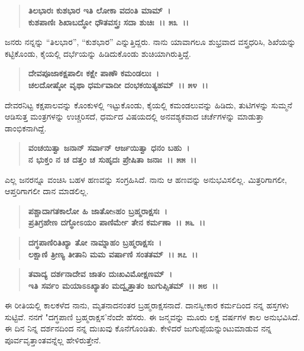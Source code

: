 \begin{verse}
\textbf{ತಿಲಭಾರಃ ಕುಶಭಾರ ಇತಿ ಲೋಕಾ ವದಂತಿ ಮಾಮ್~।}\\\textbf{ಕುಶಪಾಣಿಃ ಶಿಖಾಬದ್ಧೋ ಧೌತವಸ್ತ್ರಃ ಸದಾ ಶುಚಿಃ~।। ೫೩~।।}
\end{verse}

ಜನರು ನನ್ನನ್ನು “ತಿಲಭಾರ”, “ಕುಶಭಾರ” ಎನ್ನುತ್ತಿದ್ದರು. ನಾನು ಯಾವಾಗಲೂ ಶುಭ್ರವಾದ ವಸ್ತ್ರಧರಿಸಿ, ಶಿಖೆಯನ್ನು ಕಟ್ಟಿಕೊಂಡು, ಕೈಯಲ್ಲಿ ದರ್ಭೆಯನ್ನು ಹಿಡಿದುಕೊಂಡು ಶುಚಿಯಾಗಿರುತ್ತಿದ್ದೆ.

\begin{verse}
\textbf{ದೇವಪೂಜಾಕಕ್ಷಪಾಲಿಃ ಕಕ್ಷೇ ಪಾಣೌ ಕಮಂಡಲುಃ~।}\\\textbf{ಚಲದೋಷ್ಠೋ ವೃಥಾ ಧರ್ಮವಾದೀ ದಂಭಕಯಿತ್ಯಹಮ್~।। ೫೪~।।}
\end{verse}

ದೇವರನಿಟ್ಟ ಕಕ್ಷಪಾಲವನ್ನು ಕೊಂಕುಳಲ್ಲಿ ಇಟ್ಟುಕೊಂಡು, ಕೈಯಲ್ಲಿ ಕಮಂಡಲುವನ್ನು ಹಿಡಿದು, ತುಟಿಗಳನ್ನು ಸುಮ್ಮನೆ ಆಡಿಸುತ್ತ ಮಂತ್ರಗಳನ್ನು ಉಚ್ಚರಿಸದೆ, ಧರ್ಮದ ವಿಷಯದಲ್ಲಿ ಅನವಶ್ಯಕವಾದ ಚರ್ಚೆಗಳನ್ನು ಮಾಡುತ್ತಾ ಡಾಂಭಿಕನಾಗಿದ್ದೆ.

\begin{verse}
\textbf{ವಂಚಯಿತ್ವಾ ಜನಾನ್ ಸರ್ವಾನ್ ಆರ್ಜಯಿತ್ವಾ ಧನಂ ಬಹು~।}\\\textbf{ನ ಭುಕ್ತಂ ನ ಚ ದತ್ತಂ ಚ ಸುಹೃದಃ ಪ್ರೇಷಿತಾ ಜನಾಃ~।। ೫೫~।।}
\end{verse}

ಎಲ್ಲ ಜನರನ್ನೂ ವಂಚಿಸಿ ಬಹಳ ಹಣವನ್ನು ಸಂಗ್ರಹಿಸಿದೆ. ನಾನು ಆ ಹಣವನ್ನು ಅನುಭವಿಸಲಿಲ್ಲ. ಮಿತ್ರರಿಗಾಗಲೀ, ಆಪ್ತರಿಗಾಗಲೀ ದಾನ ಮಾಡಲಿಲ್ಲ.

\begin{verse}
\textbf{ಪಶ್ಚಾದಾಗತಕಾಲೋ ಹಿ ಜಾತೋsಹಂ ಬ್ರಹ್ಮರಾಕ್ಷಸಃ~।}\\\textbf{ಪ್ರತಿಗ್ರಹೇಣ ದಗ್ಧೋಽಯಂ ಪಾಣಿರ್ಮೇ ತೇನ ಕರ್ಮಣಾ~।। ೫೬~।।} 
\end{verse}

\begin{verse}
\textbf{ದಗ್ಧಪಾಣಿರಿತಿಖ್ಯಾ ತೋ ನಾಮ್ನಾಹಂ ಬ್ರಹ್ಮರಾಕ್ಷಸಃ~।}\\\textbf{ಲಕ್ಷಾಣಿ ತ್ರೀಣ್ಯ ತೀತಾನಿ ಮಮ ವರ್ಷಾಣಿ ಸಂತತಮ್~।। ೫೭~।। }
\end{verse}

\begin{verse}
\textbf{ತವಾದ್ಯ ದರ್ಶನಾದೇವ ಜಾತಂ ದುಃಖವಿಮೋಕ್ಷಣಮ್~।}\\\textbf{ಇತಿ ಸರ್ವಂ ಮಯಾಽಽಖ್ಯಾತಂ ಮದ್ವೃತ್ತಾತಂ ಜುಗುಪ್ಸಿತಮ್~।। ೫೮~।।}
\end{verse}

ಈ ರೀತಿಯಲ್ಲಿ ಕಾಲಕಳೆದ ನಾನು, ಮೃತನಾದನಂತರ ಬ್ರಹ್ಮರಾಕ್ಷಸನಾದೆ. ದಾನಸ್ವೀಕಾರ ಕರ್ಮದಿಂದ ನನ್ನ ಹಸ್ತಗಳು ಸುಟ್ಟಿವೆ. ನನಗೆ "ದಗ್ಧಪಾಣಿ ಬ್ರಹ್ಮರಾಕ್ಷಸ'ನೆಂದೇ ಹೆಸರು. ಈ ಜನ್ಮವನ್ನು ಮೂರು ಲಕ್ಷ ವರ್ಷಗಳ ಕಾಲ ಅನುಭವಿಸಿದೆ. ಈ ದಿನ ನಿನ್ನ ದರ್ಶನದಿಂದ ನನ್ನ ದುಃಖವು ಕೊನೆಗೊಂಡಿತು. ಕೇಳಿದರೆ ಜುಗುಪ್ಪೆಯನ್ನುಂಟುಮಾಡುವ ನನ್ನ ಪೂರ್ವವೃತ್ತಾಂತವನ್ನೆಲ್ಲ ಹೇಳಿರುತ್ತೇನೆ.

